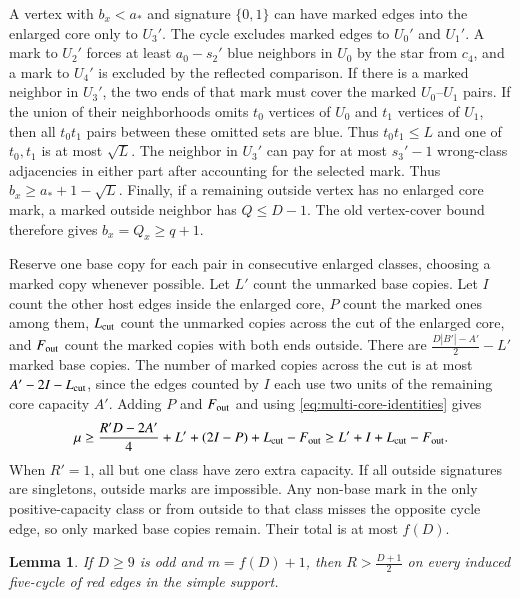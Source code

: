 \documentclass[preprint,11pt,numbers]{elsarticle-arxiv}
\numberwithin{equation}{section}
\newtheorem{lemma}[theorem]{Lemma}
\theoremstyle{definition}
\begin{document}
A vertex with $b_x<a_*$ and signature $\{0,1\}$ can have marked edges
into the enlarged core only to $U_3'$. The cycle excludes marked edges to $U_0'$ and
$U_1'$. A mark to $U_2'$ forces at least $a_0-s_2'$ blue neighbors
in $U_0$ by the star from $c_4$, and a mark to $U_4'$ is excluded
by the reflected comparison. If there is a marked neighbor in $U_3'$,
the two ends of that mark must cover the marked $U_0$--$U_1$ pairs.
If the union of their neighborhoods omits $t_0$ vertices of $U_0$
and $t_1$ vertices of $U_1$, then all $t_0t_1$ pairs between these
omitted sets are blue. Thus $t_0t_1\le L$ and one of $t_0,t_1$ is at
most $\sqrt L$.
The neighbor in $U_3'$ can pay for at most $s_3'-1$ wrong-class
adjacencies in either part after accounting for the selected mark.
Thus $b_x\ge a_*+1-\sqrt L$. Finally, if a remaining outside vertex
has no enlarged core mark, a marked outside neighbor has $Q\le D-1$.
The old vertex-cover bound therefore gives $b_x=Q_x\ge q+1$.

Reserve one base copy for each pair in consecutive enlarged
classes, choosing a marked copy whenever possible. Let $L'$
count the unmarked base copies. Let $I$ count the other host
edges inside the enlarged core, $P$ count the marked ones among
them, $L_{\rm cut}$ count the unmarked copies across the cut of
the enlarged core, and $F_{\rm out}$ count the marked copies with both ends
outside. There are $\frac{D|B'|-A'}{2}-L'$ marked base copies.
The number of marked copies across the cut is at most
$A'-2I-L_{\rm cut}$, since the edges counted by $I$ each use two
units of the remaining core capacity $A'$. Adding $P$ and $F_{\rm out}$ and
using \eqref{eq:multi-core-identities} gives
\begin{equation}\label{eq:multi-extra-capacity}
 \mu\ge \frac{R'D-2A'}{4}+L'+(2I-P)+L_{\rm cut}-F_{\rm out}
 \ge L'+I+L_{\rm cut}-F_{\rm out} .
\end{equation}
When $R'=1$, all but one class have zero extra capacity. If all
outside signatures are singletons, outside marks are impossible.
Any non-base mark in the only positive-capacity class or from
outside to that class misses the opposite cycle edge, so only marked
base copies remain. Their total is at most $f(D)$.

\begin{lemma}\label{lem:half-degree-cycle}
If $D\ge9$ is odd and $m=f(D)+1$, then $R>\frac{D+1}{2}$ on
every induced five-cycle of red edges in the simple support.
\end{lemma}
\end{document}
